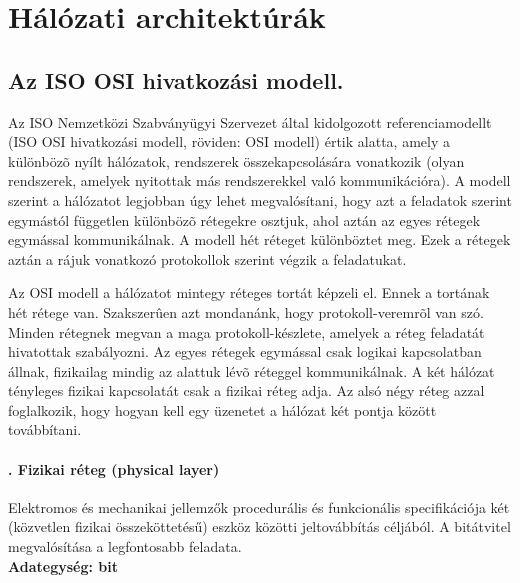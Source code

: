 \section{Hálózati architektúrák}
\subsection{Az ISO OSI hivatkozási modell.}
Az ISO Nemzetközi Szabványügyi Szervezet által kidolgozott referenciamodellt (ISO OSI hivatkozási modell, röviden: OSI modell) értik alatta, amely a különbözõ nyílt hálózatok, rendszerek összekapcsolására vonatkozik (olyan rendszerek, amelyek nyitottak más rendszerekkel való kommunikációra). A modell szerint a hálózatot legjobban úgy lehet megvalósítani, hogy azt a feladatok szerint egymástól független különbözõ rétegekre osztjuk, ahol aztán az egyes rétegek egymással kommunikálnak. A modell hét réteget különböztet meg. Ezek a rétegek aztán a rájuk vonatkozó protokollok szerint végzik a feladatukat.

Az OSI modell a hálózatot mintegy réteges tortát képzeli el. Ennek a tortának hét rétege van. Szakszerûen azt mondanánk, hogy protokoll-veremrõl van szó. Minden rétegnek megvan a maga protokoll-készlete, amelyek a réteg feladatát hivatottak szabályozni. Az egyes rétegek egymással csak logikai kapcsolatban állnak, fizikailag mindig az alattuk lévõ réteggel kommunikálnak. A két hálózat tényleges fizikai kapcsolatát csak a fizikai réteg adja. Az alsó négy réteg azzal foglalkozik, hogy hogyan kell egy üzenetet a hálózat két pontja között továbbítani.
\setcounter{paragraph}{1}
\paragraph[Fizikai réteg]{. Fizikai réteg (physical layer)}
Elektromos és mechanikai jellemzők procedurális és funkcionális specifikációja két (közvetlen fizikai összeköttetésű) eszköz közötti jeltovábbítás céljából. A bitátvitel megvalósítása a legfontosabb feladata.\\
\textbf{Adategység: bit}
